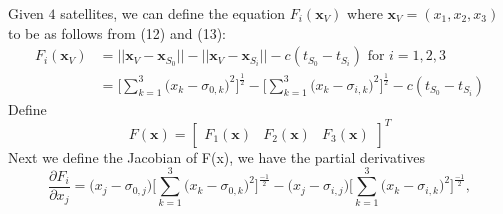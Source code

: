 \documentclass[11pt]{article}
\theoremstyle{definition}
\newcommand{\1}[1]{\mathbf{1} \left \{ #1 \right \}}
\begin{document}
Given $4$ satellites, we can define the equation $F_i (\textbf{x}_V)$ where $\textbf{x}_V = (x_1, x_2, x_3)$ to be as follows from (12) and (13):
\begin{equation}
    \begin{split}
        F_i (\textbf{x}_V) &= ||\textbf{x}_V - \textbf{x}_{S_0}|| - ||\textbf{x}_V - \textbf{x}_{S_i}|| - c(t_{S_0} - t_{S_i}) \text{ for } i = 1,2,3 \\
    &= \Bigg[\sum_{k=1}^3 \big(x_k - \sigma_{0,k}\big)^2\Bigg]^\frac{1}{2} - \Bigg[\sum_{k=1}^3 \big(x_k - \sigma_{i,k}\big)^2\Bigg]^\frac{1}{2} - c(t_{S_0} - t_{S_i})
    \end{split}
\end{equation}
Define
\[F(\textbf{x}) = \begin{bmatrix}
F_1(\textbf{x}) & F_2(\textbf{x}) & F_3(\textbf{x})
\end{bmatrix}^T\]
Next we define the Jacobian of F(x), we have the partial derivatives
\begin{equation}
    \frac{\partial F_i}{\partial x_j} = \big(x_j - \sigma_{0,j}\big) \Bigg[\sum_{k=1}^3 \big(x_k - \sigma_{0,k}\big)^2\Bigg]^\frac{-1}{2} - \big(x_j - \sigma_{i,j}\big) \Bigg[\sum_{k=1}^3 \big(x_k - \sigma_{i,k}\big)^2\Bigg]^\frac{-1}{2},
\end{equation}
\end{document}
